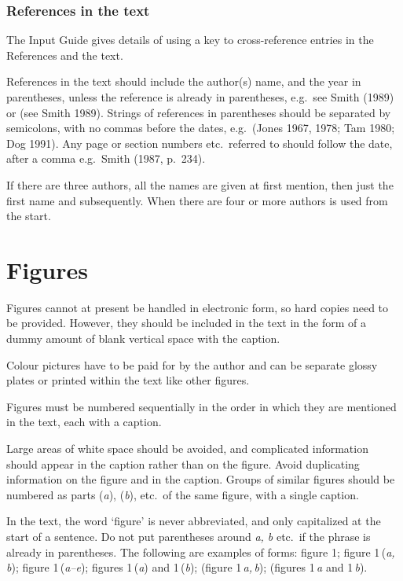 \subsubsection{References in the text}
The Input Guide gives details of using a key to cross-reference entries in the References and the text.

References in the text should include the author(s) name, and the
year in parentheses, unless the reference is already in parentheses, e.g.\
see Smith (1989) or (see Smith 1989). Strings of references in parentheses
should be separated by semicolons, with no commas before the dates, e.g.\
(Jones 1967, 1978; Tam 1980; Dog 1991). Any page or section numbers etc.\
referred to should follow the date, after a comma e.g.\ Smith (1987, 
p.~234).

If there are three authors, all the names are given at first mention, then
just the first name and \etal subsequently. When there are four or
more authors \etal is used from the start.


\section{Figures}

Figures cannot at present be handled in electronic form, so hard copies 
need to be provided. However, they should be included in the text in the 
form of a dummy amount of blank vertical space with the caption.

Colour pictures have to be paid for by the author and can be separate
glossy plates or printed within the text like other figures.

Figures must be numbered sequentially in the order in which they are mentioned in the text, each with a caption.

Large areas of white space should be avoided, and complicated information
should appear in the caption rather than on the figure. Avoid duplicating
information on the figure and in the caption. Groups of similar
figures should be numbered as parts ({\it a}), ({\it b}), etc.\ of
the same figure, with a single caption.

In the text, the word `figure' is never abbreviated, and only capitalized at
the start of a sentence. Do not put parentheses around  {\it a, b\/}
etc.\ if the phrase is already in parentheses. The following are
examples of forms: figure 1; figure 1\,({\it a,\,b\/}); 
figure 1\,({\it a--e\/}); figures 1\,({\it a\/}) and 1\,({\it b\/}); 
(figure 1\,{\it a,\,b\/}); (figures 1\,{\it a\/} and 1\,{\it b\/}).

